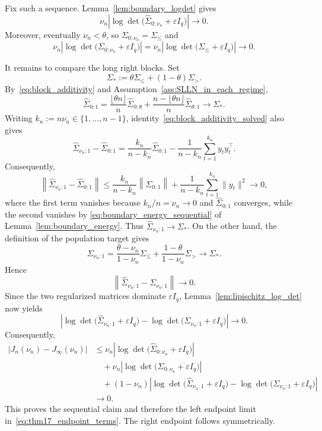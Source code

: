 \documentclass[10pt, letterpaper]{amsart}
\begin{document}
Fix such a sequence. Lemma~\ref{lem:boundary_logdet} gives
\[
\nu_n\left|\log\det\big(\widehat\Sigma_{0:\nu_n}+\varepsilon I_q\big)\right|
\longrightarrow0.
\]
Moreover, eventually $\nu_n<\theta$, so $\Sigma_{0:\nu_n}=\Sigma_{\leq}$ and
\[
\nu_n\left|\log\det\big(\Sigma_{0:\nu_n}+\varepsilon I_q\big)\right|
=\nu_n\left|\log\det\big(\Sigma_{\leq}+\varepsilon I_q\big)\right|
\longrightarrow0.
\]

It remains to compare the long right blocks. Set
\[
\Sigma_*:=\theta\Sigma_{\leq}+(1-\theta)\Sigma_{>}.
\]
 By~\eqref{eq:block_additivity} and Assumption~\ref{ass:SLLN_in_each_regime},
\[
\widehat\Sigma_{0:1}
=\frac{\lfloor\theta n\rfloor}{n}\widehat\Sigma_{0:\theta}
+\frac{n-\lfloor\theta n\rfloor}{n}\widehat\Sigma_{\theta:1}
\longrightarrow\Sigma_*.
\]
Writing $k_n:=n\nu_n\in\{1,\ldots,n-1\}$,  identity~\eqref{eq:block_additivity_solved} also gives
\[
\widehat\Sigma_{\nu_n:1}-\widehat\Sigma_{0:1}
=\frac{k_n}{n-k_n}\widehat\Sigma_{0:1}
-\frac{1}{n-k_n}\sum_{t=1}^{k_n}y_ty_t^{\top}.
\]
Consequently,
\[
\left\|\widehat\Sigma_{\nu_n:1}-\widehat\Sigma_{0:1}\right\|
\leq
\frac{k_n}{n-k_n}\left\|\widehat\Sigma_{0:1}\right\|
+\frac{1}{n-k_n}\sum_{t=1}^{k_n}\|y_t\|^2
\longrightarrow0,
\]
where the first term vanishes because $k_n/n=\nu_n\to0$ and
$\widehat\Sigma_{0:1}$ converges, while the second vanishes by
\eqref{eq:boundary_energy_sequential} of Lemma~\ref{lem:boundary_energy}.
Thus $\widehat\Sigma_{\nu_n:1}\to\Sigma_*$. On the other hand, the definition
of the population target gives
\[
\Sigma_{\nu_n:1}
=\frac{\theta-\nu_n}{1-\nu_n}\Sigma_{\leq}
+\frac{1-\theta}{1-\nu_n}\Sigma_{>}
\longrightarrow\Sigma_*.
\]
Hence
\[
\left\|\widehat\Sigma_{\nu_n:1}-\Sigma_{\nu_n:1}\right\|\longrightarrow0.
\]
Since the two regularized matrices dominate $\varepsilon I_q$,
Lemma~\ref{lem:lipischitz_log_det} now yields
\[
\left|
\log\det\big(\widehat\Sigma_{\nu_n:1}+\varepsilon I_q\big)
-\log\det\big(\Sigma_{\nu_n:1}+\varepsilon I_q\big)
\right|\longrightarrow0.
\]
Consequently,
\[
\begin{aligned}
|J_n(\nu_n)-J_\infty(\nu_n)|
&\leq \nu_n\left|\log\det\big(\widehat\Sigma_{0:\nu_n}+\varepsilon I_q\big)\right|\\
&\quad +\nu_n\left|\log\det\big(\Sigma_{0:\nu_n}+\varepsilon I_q\big)\right|\\
&\quad +(1-\nu_n)\left|
\log\det\big(\widehat\Sigma_{\nu_n:1}+\varepsilon I_q\big)
-\log\det\big(\Sigma_{\nu_n:1}+\varepsilon I_q\big)
\right|\\
&\longrightarrow0.
\end{aligned}
\]
This proves the sequential claim and
therefore the left endpoint limit in~\eqref{eq:thm17_endpoint_terms}. The right
endpoint follows symmetrically.
\end{document}
